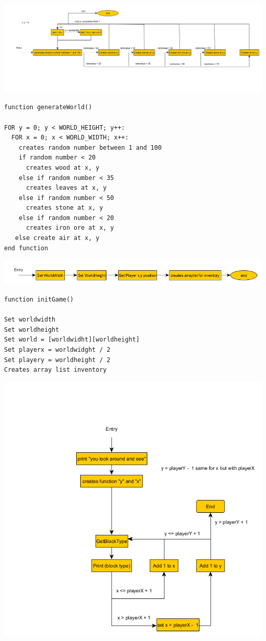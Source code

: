 \newpage
{\includegraphics[width=\textwidth]{../flowchart/generateWorld.png}}
\begin{lstlisting}
function generateWorld()

FOR y = 0; y < WORLD_HEIGHT; y++:
  FOR x = 0; x < WORLD_WIDTH; x++:
    creates random number between 1 and 100
    if random number < 20
      creates wood at x, y
    else if random number < 35
      creates leaves at x, y
    else if random number < 50
      creates stone at x, y
    else if random number < 20
      creates iron ore at x, y
   else create air at x, y
end function
\end{lstlisting}
\newpage
{\includegraphics[width=\textwidth]{../flowchart/initGame.png}}
\begin{lstlisting}
function initGame()

Set worldwidth
Set worldheight
Set world = [worldwidht][worldheight]
Set playerx = worldwidght / 2
Set playery = worldheight / 2
Creates array list inventory

\end{lstlisting}
\newpage
{\includegraphics[width=\textwidth]{../flowchart/lookAround.png}}
